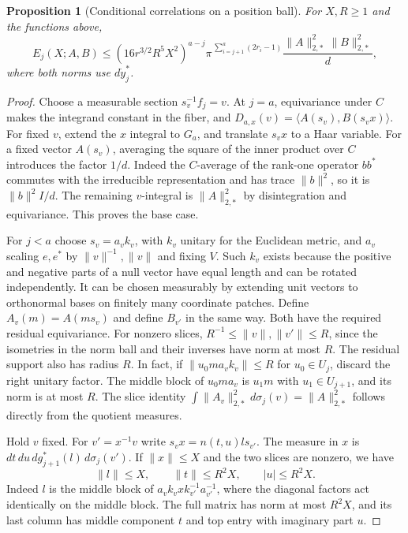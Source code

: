 \documentclass[a4paper,11pt]{article}
\newtheorem{proposition}{Proposition}[section]
\theoremstyle{definition}
\theoremstyle{remark}
\numberwithin{equation}{section}
\begin{document}
\begin{proposition}[Conditional correlations on a position ball]
\leavevmode\label{prop:recenergy912}
For \(X,R\ge1\) and the functions above,
\begin{equation}
 E_j(X;A,B)\le
    (16r^{3/2}R^5X^2)^{a-j}
    \pi^{\,\sum_{i=j+1}^{a}(2r_i-1)}
    \frac{\|A\|_{2,*}^2\,\|B\|_{2,*}^2}{d},
 \label{eq:recenergy912}
\end{equation}
where both norms use \(d\dot y_j^*\).
\end{proposition}
\begin{proof}
Choose a measurable section \(s_v^{-1}f_j=v\). At \(j=a\),
equivariance under \(C\) makes the integrand constant in the
fiber, and \(D_{a,x}(v)=\langle A(s_v),B(s_v x)\rangle\).
For fixed \(v\), extend the \(x\) integral to \(G_a\), and
translate \(s_v x\) to a Haar variable. For a fixed vector
\(A(s_v)\), averaging the square of the inner product over
\(C\) introduces the factor \(1/d\). Indeed the \(C\)-average
of the rank-one operator \(bb^*\) commutes with the irreducible
representation and has trace \(\|b\|^2\), so it is
\(\|b\|^2 I/d\). The remaining \(v\)-integral is
\(\|A\|_{2,*}^2\) by disintegration and equivariance.
This proves the base case.

For \(j<a\) choose \(s_v=a_vk_v\), with \(k_v\) unitary for
the Euclidean metric, and \(a_v\) scaling \(e,e^*\) by
\(\|v\|^{-1},\|v\|\) and fixing \(V\). Such \(k_v\) exists
because the positive and negative parts of a null vector
have equal length and can be rotated independently.
It can be chosen measurably by extending unit vectors to
orthonormal bases on finitely many coordinate patches. Define
\(A_v(m)=A(m s_v)\) and define \(B_{v'}\) in the same way.
Both have the required residual equivariance. For nonzero
slices, \(R^{-1}\le\|v\|,\|v'\|\le R\), since the isometries
in the norm ball and their inverses have norm at most \(R\).
The residual support also has radius \(R\). In fact, if
\(\|u_0 m a_vk_v\|\le R\) for \(u_0\in U_j\), discard the
right unitary factor. The middle block of \(u_0 m a_v\)
is \(u_1m\) with \(u_1\in U_{j+1}\), and its norm is at most
\(R\). The slice identity
\(\int\|A_v\|_{2,*}^2\,d\sigma_j(v)=\|A\|_{2,*}^2\)
follows directly from the quotient measures.

Hold \(v\) fixed. For \(v'=x^{-1}v\) write
\(s_v x=n(t,u)l s_{v'}\). The measure in \(x\) is
\(dt\,du\,dg_{j+1}^*(l)\,d\sigma_j(v')\). If \(\|x\|\le X\)
and the two slices are nonzero, we have
\[
        \|l\|\le X,\qquad \|t\|\le R^2X,\qquad |u|\le R^2X .
\]
Indeed \(l\) is the middle block of
\(a_v k_v x k_{v'}^{-1}a_{v'}^{-1}\), where the diagonal
factors act identically on the middle block. The full matrix
has norm at most \(R^2X\), and its last column has middle
component \(t\) and top entry with imaginary part \(u\).


\end{proof}
\end{document}
